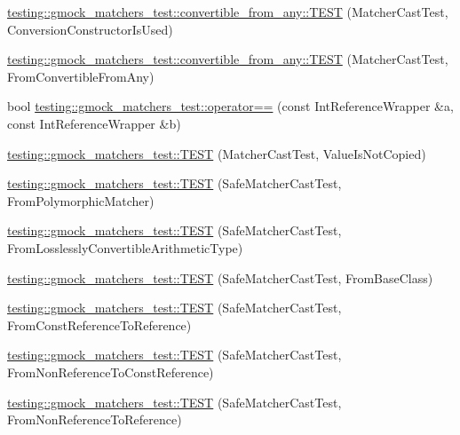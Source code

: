 \begin{DoxyCompactItemize}
\item 
\mbox{\hyperlink{namespacetesting_1_1gmock__matchers__test_1_1convertible__from__any_af5ebdc7f68d7e1e48c6dacfaffd6f58a}{testing\+::gmock\+\_\+matchers\+\_\+test\+::convertible\+\_\+from\+\_\+any\+::\+T\+E\+ST}} (Matcher\+Cast\+Test, Conversion\+Constructor\+Is\+Used)
\item 
\mbox{\hyperlink{namespacetesting_1_1gmock__matchers__test_1_1convertible__from__any_a72a4c336022bdea69ce15ba085f0e58e}{testing\+::gmock\+\_\+matchers\+\_\+test\+::convertible\+\_\+from\+\_\+any\+::\+T\+E\+ST}} (Matcher\+Cast\+Test, From\+Convertible\+From\+Any)
\item 
bool \mbox{\hyperlink{namespacetesting_1_1gmock__matchers__test_a33c068c32bf5118e5be92771b146db77}{testing\+::gmock\+\_\+matchers\+\_\+test\+::operator==}} (const Int\+Reference\+Wrapper \&a, const Int\+Reference\+Wrapper \&b)
\item 
\mbox{\hyperlink{namespacetesting_1_1gmock__matchers__test_ae99c08c8a815964b61f98a4785cf79b5}{testing\+::gmock\+\_\+matchers\+\_\+test\+::\+T\+E\+ST}} (Matcher\+Cast\+Test, Value\+Is\+Not\+Copied)
\item 
\mbox{\hyperlink{namespacetesting_1_1gmock__matchers__test_a29c04361c022a71711dbf9d3cf2a5050}{testing\+::gmock\+\_\+matchers\+\_\+test\+::\+T\+E\+ST}} (Safe\+Matcher\+Cast\+Test, From\+Polymorphic\+Matcher)
\item 
\mbox{\hyperlink{namespacetesting_1_1gmock__matchers__test_a70bbe53742db988a828d9e8201e34770}{testing\+::gmock\+\_\+matchers\+\_\+test\+::\+T\+E\+ST}} (Safe\+Matcher\+Cast\+Test, From\+Losslessly\+Convertible\+Arithmetic\+Type)
\item 
\mbox{\hyperlink{namespacetesting_1_1gmock__matchers__test_a937469149aee65efde526091af1e4f78}{testing\+::gmock\+\_\+matchers\+\_\+test\+::\+T\+E\+ST}} (Safe\+Matcher\+Cast\+Test, From\+Base\+Class)
\item 
\mbox{\hyperlink{namespacetesting_1_1gmock__matchers__test_a14ba7c67551222321056e4da6708010f}{testing\+::gmock\+\_\+matchers\+\_\+test\+::\+T\+E\+ST}} (Safe\+Matcher\+Cast\+Test, From\+Const\+Reference\+To\+Reference)
\item 
\mbox{\hyperlink{namespacetesting_1_1gmock__matchers__test_ad53741423311d4f76d9d980f59ec8d65}{testing\+::gmock\+\_\+matchers\+\_\+test\+::\+T\+E\+ST}} (Safe\+Matcher\+Cast\+Test, From\+Non\+Reference\+To\+Const\+Reference)
\item 
\mbox{\hyperlink{namespacetesting_1_1gmock__matchers__test_a362ce5b2b395dfd6363e4d80b49951f1}{testing\+::gmock\+\_\+matchers\+\_\+test\+::\+T\+E\+ST}} (Safe\+Matcher\+Cast\+Test, From\+Non\+Reference\+To\+Reference)

\end{DoxyCompactItemize}
